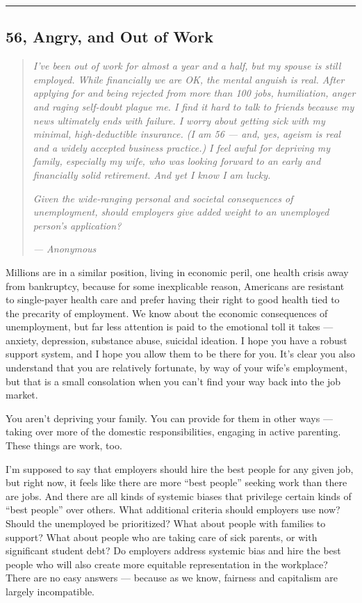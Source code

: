 \begin{center}\rule{0.5\linewidth}{\linethickness}\end{center}

\hypertarget{56-angry-and-out-of-work}{%
\subsection{56, Angry, and Out of Work}\label{56-angry-and-out-of-work}}

\begin{quote}
\emph{I've been out of work for almost a year and a half, but my spouse
is still employed. While financially we are OK, the mental anguish is
real. After applying for and being rejected from more than 100 jobs,
humiliation, anger and raging self-doubt plague me. I find it hard to
talk to friends because my news ultimately ends with failure. I worry
about getting sick with my minimal, high-deductible insurance. (I am 56
--- and, yes, ageism is real and a widely accepted business practice.)}
\emph{I feel awful for depriving my family, especially my wife, who was
looking forward to an early and financially solid retirement. And yet I
know I am lucky.}

\emph{Given the wide-ranging personal and societal consequences of
unemployment, should employers give added weight to an unemployed
person's application?}

\emph{--- Anonymous}
\end{quote}

Millions are in a similar position, living in economic peril, one health
crisis away from bankruptcy, because for some inexplicable reason,
Americans are resistant to single-payer health care and prefer having
their right to good health tied to the precarity of employment. We know
about the economic consequences of unemployment, but far less attention
is paid to the emotional toll it takes --- anxiety, depression,
substance abuse, suicidal ideation. I hope you have a robust support
system, and I hope you allow them to be there for you. It's clear you
also understand that you are relatively fortunate, by way of your wife's
employment, but that is a small consolation when you can't find your way
back into the job market.

You aren't depriving your family. You can provide for them in other ways
--- taking over more of the domestic responsibilities, engaging in
active parenting. These things are work, too.

I'm supposed to say that employers should hire the best people for any
given job, but right now, it feels like there are more ``best people''
seeking work than there are jobs. And there are all kinds of systemic
biases that privilege certain kinds of ``best people'' over others. What
additional criteria should employers use now? Should the unemployed be
prioritized? What about people with families to support? What about
people who are taking care of sick parents, or with significant student
debt? Do employers address systemic bias and hire the best people who
will also create more equitable representation in the workplace? There
are no easy answers --- because as we know, fairness and capitalism are
largely incompatible.

